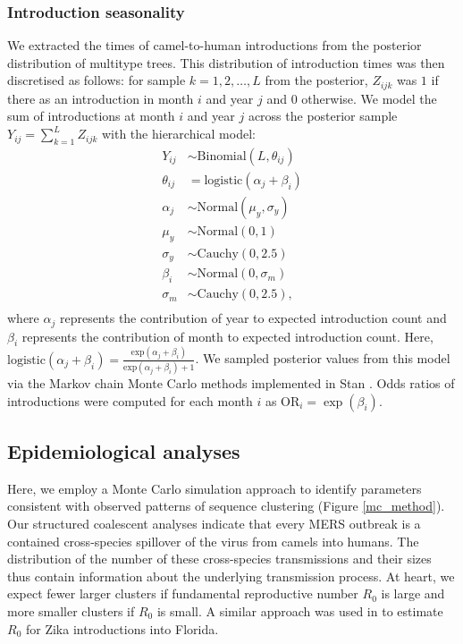 \documentclass[11pt,oneside,letterpaper]{article}
\begin{document}
\subsubsection*{Introduction seasonality}

We extracted the times of camel-to-human introductions from the posterior distribution of multitype trees.
This distribution of introduction times was then discretised as follows: for sample  $k = 1, 2, \ldots, L$ from the posterior,  $Z_{ijk}$ was $1$ if there as an introduction in month $i$ and year $j$ and $0$ otherwise.
We model the sum of introductions at month $i$ and year $j$ across the posterior sample $Y_{ij} = \sum_{k = 1}^L Z_{ijk}$ with the hierarchical model:
\begin{align*}
  Y_{ij} &\sim \text{Binomial}(L, \theta_{ij}) \\
  \theta_{ij} &= \mathrm{logistic}(\alpha_j + \beta_i) \\
  \alpha_j &\sim \text{Normal}(\mu_{y}, \sigma_{y}) \\
  \mu_{y}  &\sim  \text{Normal}(0, 1) \\
  \sigma_{y} &\sim \text{Cauchy}(0, 2.5) \\
  \beta_i &\sim \text{Normal}(0, \sigma_{m}) \\
  \sigma_{m} &\sim \text{Cauchy}(0, 2.5), \\
\end{align*}
where $\alpha_j$ represents the contribution of year to expected introduction count and $\beta_i$ represents the contribution of month to expected introduction count.
Here, $\mathrm{logistic}(\alpha_j + \beta_i) =  \frac{\mathrm{exp}(\alpha_j + \beta_i)}{\mathrm{exp}(\alpha_j + \beta_i) + 1}$.
We sampled posterior values from this model via the Markov chain Monte Carlo methods implemented in Stan \citep{carpenter_stan_2016}.
Odds ratios of introductions were computed for each month $i$ as $\text{OR}_i = \exp(\beta_i)$.

\subsection*{Epidemiological analyses}

Here, we employ a Monte Carlo simulation approach to identify parameters consistent with observed patterns of sequence clustering (Figure \ref{mc_method}).
Our structured coalescent analyses indicate that every MERS outbreak is a contained cross-species spillover of the virus from camels into humans.
The distribution of the number of these cross-species transmissions and their sizes thus contain information about the underlying transmission process.
At heart, we expect fewer larger clusters if fundamental reproductive number $R_0$ is large and more smaller clusters if $R_0$ is small.
A similar approach was used in \citet{grubaugh_multiple_2017} to estimate $R_0$ for Zika introductions into Florida.
\end{document}

